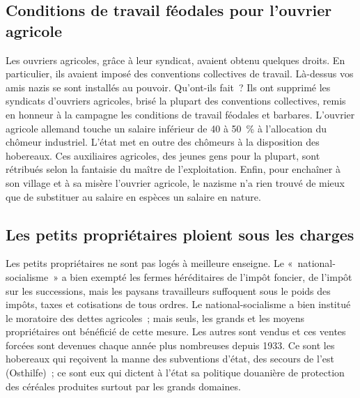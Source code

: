 \documentclass[french,twoside]{book} %
\begin{document}
\subsection[Conditions de travail féodales pour l’ouvrier agricole]{Conditions de travail féodales pour l’ouvrier agricole}
\noindent Les ouvriers agricoles, grâce à leur syndicat, avaient obtenu quelques droits. En particulier, ils avaient imposé des conventions collectives de travail. Là-dessus vos amis nazis se sont installés au pouvoir. Qu’ont-ils fait ? Ils ont supprimé les syndicats d’ouvriers agricoles, brisé la plupart des conventions collectives, remis en honneur à la campagne les conditions de travail féodales et barbares. L’ouvrier agricole allemand touche un salaire inférieur de 40 à 50 \% à l’allocation du chômeur industriel. L’état met en outre des chômeurs à la disposition des hobereaux. Ces auxiliaires agricoles, des jeunes gens pour la plupart, sont rétribués selon la fantaisie du maître de l’exploitation. Enfin, pour enchaîner à son village et à sa misère l’ouvrier agricole, le nazisme n’a rien trouvé de mieux que de substituer au salaire en espèces un salaire en nature.
\subsection[Les petits propriétaires ploient sous les charges]{Les petits propriétaires ploient sous les charges}
\noindent Les petits propriétaires ne sont pas logés à meilleure enseigne. Le « national-socialisme » a bien exempté les fermes héréditaires de l’impôt foncier, de l’impôt sur les successions, mais les paysans travailleurs suffoquent sous le poids des impôts, taxes et cotisations de tous ordres. Le national-socialisme a bien institué le moratoire des dettes agricoles ; mais seuls, les grands et les moyens propriétaires ont bénéficié de cette mesure. Les autres sont vendus et ces ventes forcées sont devenues chaque année plus nombreuses depuis 1933. Ce sont les hobereaux qui reçoivent la manne des subventions d’état, des secours de l’est (Osthilfe) ; ce sont eux qui dictent à l’état sa politique douanière de protection des céréales produites surtout par les grands domaines.
\end{document}

